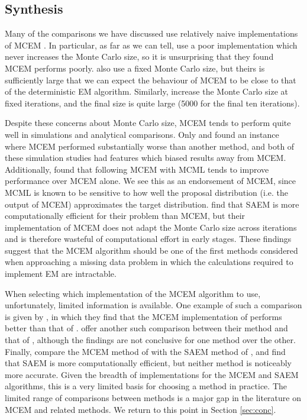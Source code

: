 \documentclass[ss]{imsart}
\theoremstyle{plain}
\theoremstyle{definition}
\theoremstyle{remark}
\begin{document}
\subsection{Synthesis}
Many of the comparisons we have discussed use relatively naive implementations of MCEM \citep{McC97, Gu98I,Jan03}. In particular, as far as we can tell, \citet{Gu98I} use a poor implementation which never increases the Monte Carlo size, so it is unsurprising that they found MCEM performs poorly. \citet{Jan03} also use a fixed Monte Carlo size, but theirs is sufficiently large that we can expect the behaviour of MCEM to be close to that of the deterministic EM algorithm. Similarly, \citet{McC97} increase the Monte Carlo size at fixed iterations, and the final size is quite large (5000 for the final ten iterations).

Despite these concerns about Monte Carlo size, MCEM tends to perform quite well in simulations and analytical comparisons. Only \citet{Gu98I} and \citet{Boo01} found an instance where MCEM performed substantially worse than another method, and both of these simulation studies had features which biased results away from MCEM. Additionally, \citep{McC97} found that following MCEM with MCML tends to improve performance over MCEM alone. We see this as an endorsement of MCEM, since MCML is known to be sensitive to how well the proposal distribution (i.e. the output of MCEM) approximates the target distribution. \citet{Bae16} find that SAEM is more computationally efficient for their problem than MCEM, but their implementation of MCEM does not adapt the Monte Carlo size across iterations and is therefore wasteful of computational effort in early stages. These findings suggest that the MCEM algorithm should be one of the first methods considered when approaching a missing data problem in which the calculations required to implement EM are intractable.

When selecting which implementation of the MCEM algorithm to use, unfortunately, limited information is available. One example of such a comparison is given by \citet{Tre14}, in which they find that the MCEM implementation of \citet{Caf05} performs better than that of \citet{Wei90}. \citet{Caf05} offer another such comparison between their method and that of \citet{Boo99}, although the findings are not conclusive for one method over the other. Finally, \citet{Bae16} compare the MCEM method of \citet{McC89} with the SAEM method of \citet{Del99}, and find that SAEM is more computationally efficient, but neither method is noticeably more accurate. Given the breadth of implementations for the MCEM and SAEM algorithms, this is a very limited basis for choosing a method in practice. The limited range of comparisons between methods is a major gap in the literature on MCEM and related methods. We return to this point in Section \ref{sec:conc}.
\end{document}
